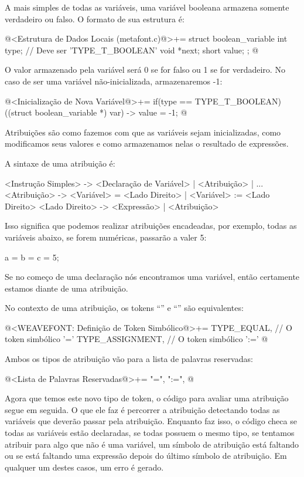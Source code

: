 
A mais simples de todas as variáveis, uma variável booleana armazena
somente verdadeiro ou falso. O formato de sua estrutura é:

\iniciocodigo
@<Estrutura de Dados Locais (metafont.c)@>+=
struct boolean_variable{
  int type; // Deve ser 'TYPE_T_BOOLEAN'
  void *next;
  short value;
};
@
\fimcodigo

O valor  armazenado pela variável será 0 se for
falso ou 1 se for verdadeiro. No caso de ser uma variável
não-inicializada, armazenaremos -1:

\iniciocodigo
@<Inicialização de Nova Variável@>+=
if(type == TYPE_T_BOOLEAN)
  ((struct boolean_variable *) var) -> value = -1;
@
\fimcodigo



Atribuições são como fazemos com que as variáveis sejam inicializadas,
como modificamos seus valores e como armazenamos nelas o resultado de
expressões.

A sintaxe de uma atribuição é:

\alinhaverbatim
<Instrução Simples> -> <Declaração de Variável> | <Atribuição> | ...
<Atribuição> -> <Variável> = <Lado Direito> |
                <Variável> := <Lado Direito>
<Lado Direito> -> <Expressão> | <Atribuição>
\alinhanormal

Isso significa que podemos realizar atribuições encadeadas, por
exemplo, todas as variáveis abaixo, se forem numéricas, passarão a
valer 5:

\alinhaverbatim
a = b = c = 5;
\alinhanormal

Se no começo de uma declaração nós encontramos uma variável, então
certamente estamos diante de uma atribuição.

No contexto de uma atribuição, os tokens ``\monoespaco{=}'' e
``\monoespaco{:=}'' são equivalentes:

\iniciocodigo
@<WEAVEFONT: Definição de Token Simbólico@>+=
TYPE_EQUAL,            // O token simbólico '='
TYPE_ASSIGNMENT,       // O token simbólico ':='
@
\fimcodigo

Ambos os tipos de atribuição vão para a lista de palavras reservadas:

\iniciocodigo
@<Lista de Palavras Reservadas@>+=
"=", ":=",
@
\fimcodigo

Agora que temos este novo tipo de token, o código para avaliar uma
atribuição segue em seguida. O que ele faz é percorrer a atribuição
detectando todas as variáveis que deverão passar pela
atribuição. Enquanto faz isso, o código checa se todas as variáveis
estão declaradas, se todas possuem o mesmo tipo, se tentamos atribuir
para algo que não é uma variável, um símbolo de atribuição está
faltando ou se está faltando uma expressão depois do último símbolo de
atribuição. Em qualquer um destes casos, um erro é gerado.

